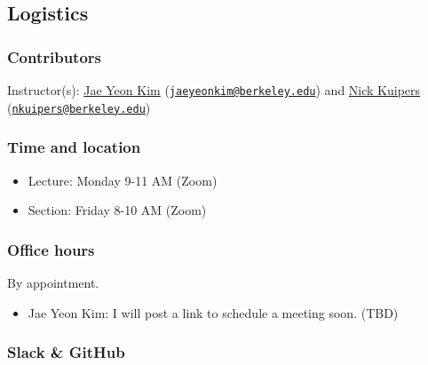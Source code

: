 \documentclass[
]{article}
\providecommand{\tightlist}{%
  \setlength{\itemsep}{0pt}\setlength{\parskip}{0pt}}
\begin{document}
\hypertarget{logistics}{%
\subsection{Logistics}\label{logistics}}

\hypertarget{contributors}{%
\subsubsection{Contributors}\label{contributors}}

Instructor(s): \href{https://jaeyk.github.io/}{Jae Yeon Kim}
(\href{mailto:jaeyeonkim@berkeley.edu}{\nolinkurl{jaeyeonkim@berkeley.edu}})
and \href{https://nicholaskuipers.com/}{Nick Kuipers}
(\href{mailto:nkuipers@berkeley.edu}{\nolinkurl{nkuipers@berkeley.edu}})

\hypertarget{time-and-location}{%
\subsubsection{Time and location}\label{time-and-location}}

\begin{itemize}
\item
  Lecture: Monday 9-11 AM (Zoom)
\item
  Section: Friday 8-10 AM (Zoom)
\end{itemize}

\hypertarget{office-hours}{%
\subsubsection{Office hours}\label{office-hours}}

By appointment.

\begin{itemize}
\tightlist
\item
  Jae Yeon Kim: I will post a link to schedule a meeting soon. (TBD)
\end{itemize}

\hypertarget{slack-github}{%
\subsubsection{Slack \& GitHub}\label{slack-github}}
\end{document}

